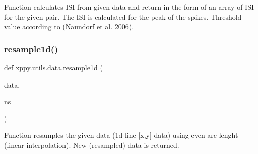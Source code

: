 \begin{DoxyVerb}Function calculates ISI from given data and return in the form of an array
of ISI for the given pair. The ISI is calculated for the peak of the spikes.
Threshold value according to (Naundorf et al. 2006).
\end{DoxyVerb}
 \mbox{\label{namespacexppy_1_1utils_1_1data_a7306f92ed3b5678b74bd4e0fa75ddb6e}} 
\subsubsection{\texorpdfstring{resample1d()}{resample1d()}}
{\footnotesize\ttfamily def xppy.\+utils.\+data.\+resample1d (\begin{DoxyParamCaption}\item[{}]{data,  }\item[{}]{ns }\end{DoxyParamCaption})}

\begin{DoxyVerb}Function resamples the given data (1d line [x,y] data) using even 
arc lenght (linear interpolation). New (resampled) data is returned.  
\end{DoxyVerb}
 